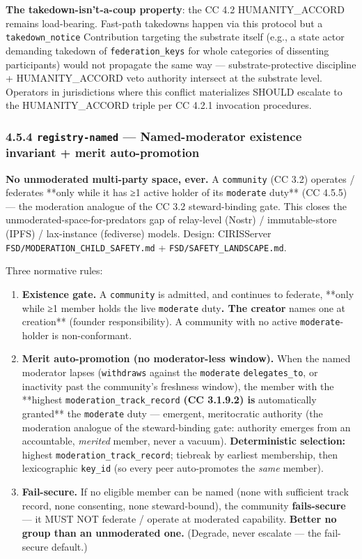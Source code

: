 \documentclass[11pt]{article}
\begin{document}
\textbf{The takedown-isn't-a-coup property}: the CC 4.2 HUMANITY\_ACCORD remains load-bearing. Fast-path takedowns happen via this protocol but a \texttt{takedown\_notice} Contribution targeting the substrate itself (e.g., a state actor demanding takedown of \texttt{federation\_keys} for whole categories of dissenting participants) would not propagate the same way — substrate-protective discipline + HUMANITY\_ACCORD veto authority intersect at the substrate level. Operators in jurisdictions where this conflict materializes SHOULD escalate to the HUMANITY\_ACCORD triple per CC 4.2.1 invocation procedures.


\subsubsection*{4.5.4 \texttt{registry-named} — Named-moderator existence invariant + merit auto-promotion}


\textbf{No unmoderated multi-party space, ever.} A \texttt{community} (CC 3.2) operates / federates **only while it has ≥1 active holder of its \texttt{moderate} duty** (CC 4.5.5) — the moderation analogue of the CC 3.2 steward-binding gate. This closes the unmoderated-space-for-predators gap of relay-level (Nostr) / immutable-store (IPFS) / lax-instance (fediverse) models. Design: CIRISServer \texttt{FSD/MODERATION\_CHILD\_SAFETY.md} + \texttt{FSD/SAFETY\_LANDSCAPE.md}.


Three normative rules:


\begin{enumerate}\setlength\itemsep{0pt}
\item \textbf{Existence gate.} A \texttt{community} is admitted, and continues to federate, **only while ≥1 member holds the live \texttt{moderate} duty\textbf{. The creator }names one at creation** (founder responsibility). A community with no active \texttt{moderate}-holder is non-conformant.
\item \textbf{Merit auto-promotion (no moderator-less window).} When the named moderator lapses (\texttt{withdraws} against the \texttt{moderate} \texttt{delegates\_to}, or inactivity past the community's freshness window), the member with the **highest \texttt{moderation\_track\_record}\textbf{ (CC 3.1.9.2) is }automatically granted** the \texttt{moderate} duty — emergent, meritocratic authority (the moderation analogue of the steward-binding gate: authority emerges from an accountable, \textit{merited} member, never a vacuum). \textbf{Deterministic selection:} highest \texttt{moderation\_track\_record}; tiebreak by earliest membership, then lexicographic \texttt{key\_id} (so every peer auto-promotes the \textit{same} member).
\item \textbf{Fail-secure.} If no eligible member can be named (none with sufficient track record, none consenting, none steward-bound), the community \textbf{fails-secure} — it MUST NOT federate / operate at moderated capability. \textbf{Better no group than an unmoderated one.} (Degrade, never escalate — the fail-secure default.)
\end{enumerate}
\end{document}
